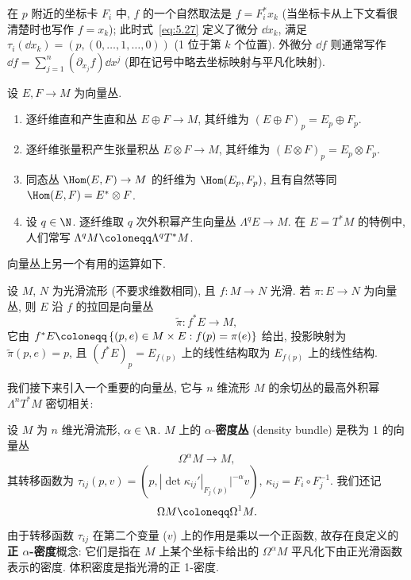 \begin{example}[切丛与余切丛]
在 $p$ 附近的坐标卡 $F_i$ 中, $f$ 的一个自然取法是 $f = F_i^* x_k$ (当坐标卡从上下文看很清楚时也写作 $f = x_k$); 此时式~\eqref{eq:5.27} 定义了微分 $\dd x_k$, 满足 $\tau_i(\dd x_k) = (p, (0, \ldots, 1, \ldots, 0))$ (1 位于第 $k$ 个位置). 外微分 $\dd f$ 则通常写作 $\dd f = \sum_{j=1}^n (\partial_{x_j} f) \dd x^j$ (即在记号中略去坐标映射与平凡化映射).
\end{example}

\begin{example}[向量丛上的代数运算]\label{eg:5.8}
设 $E, F \to M$ 为向量丛.
\begin{enumerate}
    \item 逐纤维直和产生直和丛 $E \oplus F \to M$, 其纤维为 $(E \oplus F)_p = E_p \oplus F_p$.
    \item 逐纤维张量积产生张量积丛 $E \otimes F \to M$, 其纤维为 $(E \otimes F)_p = E_p \otimes F_p$.
    \item 同态丛 $\Hom(E, F) \to M$ 的纤维为 $\Hom(E_p, F_p)$, 且有自然等同 $\Hom(E, F) = E^* \otimes F$.
    \item 设 $q \in \N$. 逐纤维取 $q$ 次外积幂产生向量丛 $\Lambda^q E \to M$. 在 $E = T^* M$ 的特例中, 人们常写 $\Lambda^q M \defeq \Lambda^q T^* M$.
\end{enumerate}
\end{example}

向量丛上另一个有用的运算如下.

\begin{definition}[拉回向量丛]\label{def:5.9}
设 $M$, $N$ 为光滑流形 (不要求维数相同), 且 $f \colon M \to N$ 光滑. 若 $\pi \colon E \to N$ 为向量丛, 则 $E$ 沿 $f$ 的拉回是向量丛 \begin{equation}\label{eq:5.29}
    \tilde{\pi} \colon f^* E \to M,
\end{equation}
它由 $f^* E \defeq \left\{ (p, e) \in M \times E : f(p) = \pi(e) \right\}$ 给出, 投影映射为 $\tilde{\pi}(p, e) = p$, 且 $(f^* E)_p = E_{f(p)}$ 上的线性结构取为 $E_{f(p)}$ 上的线性结构.
\end{definition}

我们接下来引入一个重要的向量丛, 它与 $n$ 维流形 $M$ 的余切丛的最高外积幂 $\Lambda^n T^* M$ 密切相关:

\begin{definition}[密度丛]\label{def:5.10}
设 $M$ 为 $n$ 维光滑流形, $\alpha \in \R$. $M$ 上的 $\alpha$-\textbf{密度丛} (density bundle) 是秩为 1 的向量丛
\begin{equation}\label{eq:5.30}
    \Omega^\alpha M \to M,
\end{equation}
其转移函数为 $\tau_{ij}(p, v) = \left( p, |\!\det \kappa_{ij}'|_{F_j(p)}|^{-\alpha} v \right)$, $\kappa_{ij} = F_i \circ F_j^{-1}$. 我们还记
\begin{equation}\label{eq:5.31}
    \Omega M \defeq \Omega^1 M.
\end{equation}
由于转移函数 $\tau_{ij}$ 在第二个变量 ($v$) 上的作用是乘以一个正函数, 故存在良定义的\textbf{正 $\alpha$-密度}概念: 它们是指在 $M$ 上某个坐标卡给出的 $\Omega^\alpha M$ 平凡化下由正光滑函数表示的密度. 体积密度是指光滑的正 1-密度.
\end{definition}

